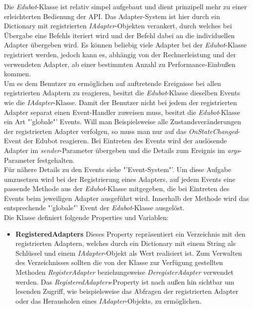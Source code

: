 Die \textit{Edubot}-Klasse ist relativ simpel aufgebaut und dient prinzipell mehr zu einer erleichterten Bedienung der API. Das Adapter-System ist hier durch ein Dictionary mit registrierten \textit{IAdapter}-Objekten verankert, durch welches bei Übergabe eine Befehls iteriert wird und der Befehl dabei an die individuellen Adapter übergeben wird. Es können beliebig viele Adapter bei der \textit{Edubot}-Klasse registriert werden, jedoch kann es, abhängig von der Rechnerleistung und der verwendeten Adapter, ab einer bestimmten Anzahl zu Performance-Einbußen kommen.\\
Um es dem Benutzer zu ermöglichen auf auftretende Ereignisse bei allen registrierten Adaptern zu reagieren, besitzt die \textit{Edubot}-Klasse dieselben Events wie die \textit{IAdapter}-Klasse. Damit der Benutzer nicht bei jedem der registrierten Adapter separat einen Event-Handler zuweisen muss, besitzt die \textit{Edubot}-Klasse ein Art "'globale"' Events. Will man Beispielsweise alle Zustandsveränderungen der registrierten Adapter verfolgen, so muss man nur auf das \textit{OnStateChanged}-Event der Edubot reagieren. Bei Eintreten des Events wird der auslösende Adapter im \textit{sender}-Parameter übergeben und die Details zum Ereignis im \textit{args}-Parameter festgehalten.\\
Für nähere Details zu den Events siehe "'Event-System"'. Um diese Aufgabe umzusetzen wird bei der Registrierung eines Adapters, auf jedem Events eine passende Methode aus der \textit{Edubot}-Klasse mitgegeben, die bei Eintreten des Events beim jeweiligen Adapter ausgeführt wird. Innerhalb der Methode wird das entsprechende "'globale"' Event der \textit{Edubot}-Klasse ausgelöst.\\
Die Klasse definiert folgende Properties und Variablen:
\begin{itemize}
\item \textbf{RegisteredAdapters}
\newline
Dieses Property repräsentiert ein Verzeichnis mit den registrierten Adaptern, welches durch ein Dictionary mit einem String als Schlüssel und einem \textit{IAdapter}-Objekt als Wert realisiert ist. Zum Verwalten des Verzeichnisses sollten die von der Klasse zur Verfügung gestellten Methoden \textit{RegisterAdapter} beziehungsweise \textit{DeregisterAdapter} verwendet werden. Das \textit{RegisteredAdapters}-Property ist nach außen hin sichtbar um lesenden Zugriff, wie beispielsweise das Abfragen der registrierten Adapter oder das Herausholen eines \textit{IAdapter}-Objekts, zu ermöglichen. 
\end{itemize}

